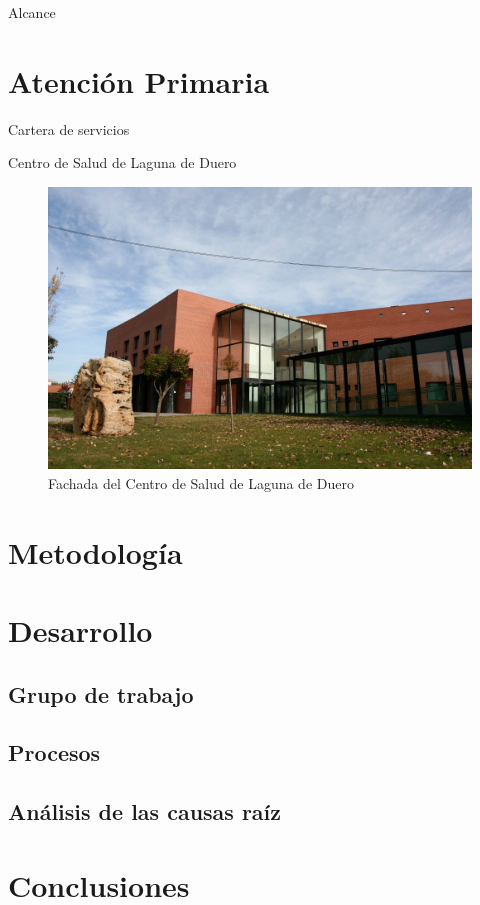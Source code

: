 \documentclass{beamer}
\begin{document}
\begin{frame}{Alcance}

\end{frame}

\section{Atención Primaria}

\begin{frame}{Cartera de servicios}
    
\end{frame}

\begin{frame}{Centro de Salud de Laguna de Duero}
    \begin{figure}
        \centering
        \includegraphics[height=0.7\textheight]{img/centro-salud.jpg}
        \caption{Fachada del Centro de Salud de Laguna de Duero}
    \end{figure}
\end{frame}

\section{Metodología}
\section{Desarrollo}
\subsection{Grupo de trabajo}
\subsection{Procesos}
\subsection{Análisis de las causas raíz}
\section{Conclusiones}
\end{document}
